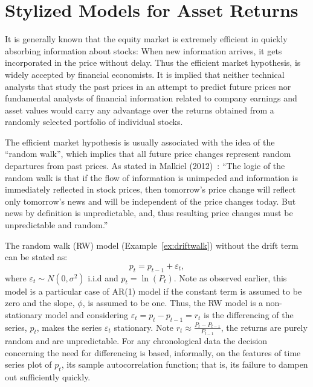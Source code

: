 \section{Stylized Models for Asset Returns}


It is generally known that the equity market is extremely efficient in quickly absorbing information about stocks: When new information arrives, it gets incorporated in the price without delay. Thus the efficient market hypothesis, is widely accepted by financial economists. It is implied that neither technical analysts that study the past prices in an attempt to predict future prices nor fundamental analysts of financial information related to company earnings and asset values would carry any advantage over the returns obtained from a randomly selected portfolio of individual stocks.


The efficient market hypothesis is usually associated with the idea of the ``random walk'', which implies that all future price changes represent random departures from past prices. As stated in Malkiel (2012)~\cite{malkiel}: ``The logic of the random walk is that if the flow of information is unimpeded and information is immediately reflected in stock prices, then tomorrow's price change will reflect only tomorrow's news and will be independent of the price changes today. But news by definition is unpredictable, and, thus resulting price changes must be unpredictable and random.''


The random walk (RW) model (Example~\ref{ex:driftwalk}) without the drift term can be stated as:
	\begin{equation} \label{eqn:2pteq}
	p_t = p_{t-1} + \varepsilon_t,
	\end{equation}
where $\varepsilon_t \sim N(0,\sigma^2)$ i.i.d and $p_t = \ln{(P_t)}$. Note as observed earlier, this model is a particular case of AR(1) model if the constant term is assumed to be zero and the slope, $\phi$, is assumed to be one. Thus, the RW model is a non-stationary model and considering $\varepsilon_t = p_t - p_{t-1}=r_t$ is the differencing of the series, $p_t$, makes the series $\varepsilon_t$ stationary. Note $r_t \approx \frac{P_t - P_{t-1}}{P_{t-1}}$,  the returns are purely random and are unpredictable. For any chronological data the decision concerning the need for differencing is based, informally, on the features of time series plot of $p_t$, its sample autocorrelation function; that is, its failure to dampen out sufficiently quickly. \twomedskip


